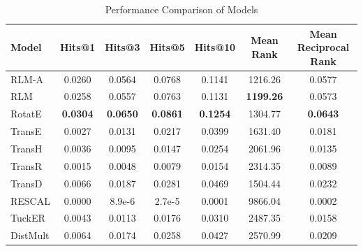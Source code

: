 \begin{table}
\centering
\caption{Performance Comparison of Models}
\label{tab:models_performance_comparison}
\begin{tabular}{@{}lcccccc@{}}
\toprule
\textbf{Model} & \textbf{Hits@1} & \textbf{Hits@3} & \textbf{Hits@5} & \textbf{Hits@10} & \textbf{Mean Rank} & \textbf{Mean Reciprocal Rank} \\ 
\midrule
RLM-A          & 0.0260          & 0.0564          & 0.0768          & 0.1141           & 1216.26            & 0.0577                        \\
RLM            & 0.0258          & 0.0557          & 0.0763          & 0.1131           & \textbf{1199.26}   & 0.0573                        \\
RotatE          & \textbf{0.0304} & \textbf{0.0650} & \textbf{0.0861} & \textbf{0.1254}  & 1304.77            & \textbf{0.0643}               \\ 
TransE        & 0.0027          & 0.0131          & 0.0217          & 0.0399           & 1631.40            & 0.0181                        \\
TransH        & 0.0036          & 0.0095          & 0.0147          & 0.0254           & 2061.96            & 0.0135                        \\
TransR        & 0.0015          & 0.0048          & 0.0079          & 0.0154           & 2314.35            & 0.0089                        \\
TransD        & 0.0066          & 0.0187          & 0.0281          & 0.0469           & 1504.44            & 0.0232                        \\
RESCAL        & 0.0000          & 8.9e-6           & 2.7e-5          & 0.0001           & 9866.04            & 0.0002                        \\
TuckER        & 0.0043          & 0.0113          & 0.0176          & 0.0310           & 2487.35            & 0.0158                        \\
DistMult      & 0.0064          & 0.0174          & 0.0258          & 0.0427           & 2570.99            & 0.0209                        \\
\bottomrule
\end{tabular}
\end{table}


